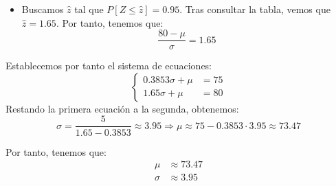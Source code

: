 \begin{ejercicio}
\begin{itemize}
        \item Buscamos $\hat{z}$ tal que $P[Z\leq \hat{z}] = 0.95$. Tras consultar la tabla, vemos que $\hat{z} = 1.65$. Por tanto, tenemos que:
        \begin{equation*}
            \dfrac{80-\mu}{\sigma} = 1.65
        \end{equation*}
    \end{itemize}

    Establecemos por tanto el sistema de ecuaciones:
    \begin{equation*}
        \left\{
            \begin{aligned}
                0.3853\sigma + \mu &= 75\\
                1.65\sigma + \mu &= 80
            \end{aligned}
        \right.
    \end{equation*}
    Restando la primera ecuación a la segunda, obtenemos:
    \begin{equation*}
        \sigma = \dfrac{5}{1.65-0.3853} \approx 3.95 \Longrightarrow
        \mu \approx 75 - 0.3853\cdot 3.95 \approx 73.47
    \end{equation*}

    Por tanto, tenemos que:
    \begin{align*}
        \mu &\approx 73.47\\
        \sigma &\approx 3.95
    \end{align*}
\end{ejercicio}

